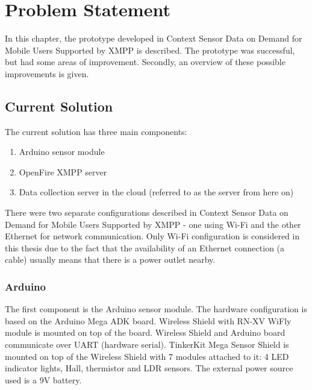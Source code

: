 
\chapter{Problem Statement} %


\ifpdf
    \graphicspath{{X/figures/PNG/}{X/figures/PDF/}{X/figures/}}
\else
    \graphicspath{{X/figures/EPS/}{X/figures/}}
\fi


In this chapter, the prototype developed in Context Sensor Data on Demand
for Mobile Users Supported by XMPP \cite{prev_thesis} is described. The prototype was successful, but had some areas of improvement. Secondly, an overview of these possible improvements is given. 

\section{Current Solution}

The current solution \cite{prev_thesis} has three main components:
\begin{enumerate}
\item Arduino sensor module
\item OpenFire XMPP server
\item Data collection server in the cloud (referred to as the server from here on)
\end{enumerate}

There were two separate configurations described in Context Sensor Data on Demand
for Mobile Users Supported by XMPP - one using Wi-Fi and the other Ethernet for network communication. Only Wi-Fi configuration is considered in this thesis due to the fact that the availability of an Ethernet connection (a cable) usually means that there is a power outlet nearby. 

\subsection{Arduino}

The first component is the Arduino sensor module. The hardware configuration is based on the Arduino Mega ADK board. Wireless Shield with RN-XV WiFly module is mounted on top of the board. Wireless Shield and Arduino board communicate over UART (hardware serial). TinkerKit Mega Sensor Shield is mounted on top of the Wireless Shield with 7 modules attached to it: 4 LED indicator lights, Hall, thermistor and LDR sensors. The external power source used is a 9V battery.

